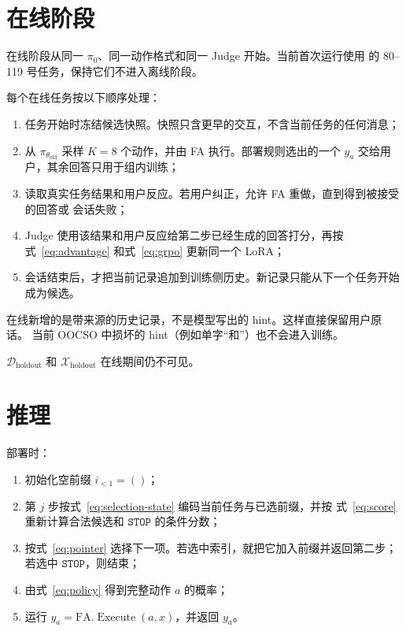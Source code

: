 \documentclass[11pt,UTF8,fontset=none]{ctexart}
\newcommand{\Dholdout}{\mathcal D_{\mathrm{holdout}}}
\newcommand{\Xholdout}{\mathcal X_{\mathrm{holdout}}}
\newcommand{\oldpolicy}{\pi_{\theta_{\mathrm{old}}}}
\newcommand{\FA}{\mathrm{FA}}
\begin{document}
\section{在线阶段}

在线阶段从同一 \(\pi_0\)、同一动作格式和同一 Judge 开始。当前首次运行使用
 的 80--119 号任务，保持它们不进入离线阶段。

每个在线任务按以下顺序处理：
\begin{enumerate}
  \item 任务开始时冻结候选快照。快照只含更早的交互，不含当前任务的任何消息；
  \item 从 \(\oldpolicy\) 采样 \(K=8\) 个动作，并由 FA 执行。部署规则选出的一个
    \(y_a\) 交给用户，其余回答只用于组内训练；
  \item 读取真实任务结果和用户反应。若用户纠正，允许 FA 重做，直到得到被接受的回答或
    会话失败；
  \item Judge 使用该结果和用户反应给第二步已经生成的回答打分，再按
    式~\eqref{eq:advantage} 和式~\eqref{eq:grpo} 更新同一个 LoRA；
  \item 会话结束后，才把当前记录追加到训练侧历史。新记录只能从下一个任务开始成为候选。
\end{enumerate}

在线新增的是带来源的历史记录，不是模型写出的 hint。这样直接保留用户原话。
当前 OOCSO 中损坏的 hint（例如单字``和''）也不会进入训练。

\(\Dholdout\) 和 \(\Xholdout\) 在线期间仍不可见。

\section{推理}

部署时：
\begin{enumerate}
  \item 初始化空前缀 \(i_{<1}=()\)；
  \item 第 \(j\) 步按式~\eqref{eq:selection-state} 编码当前任务与已选前缀，并按
    式~\eqref{eq:score} 重新计算合法候选和 \(\mathtt{STOP}\) 的条件分数；
  \item 按式~\eqref{eq:pointer} 选择下一项。若选中索引，就把它加入前缀并返回第二步；
    若选中 \(\mathtt{STOP}\)，则结束；
  \item 由式~\eqref{eq:policy} 得到完整动作 \(a\) 的概率；
  \item 运行 \(y_a=\FA.\operatorname{Execute}(a,x)\)，并返回 \(y_a\)。
\end{enumerate}
\end{document}
